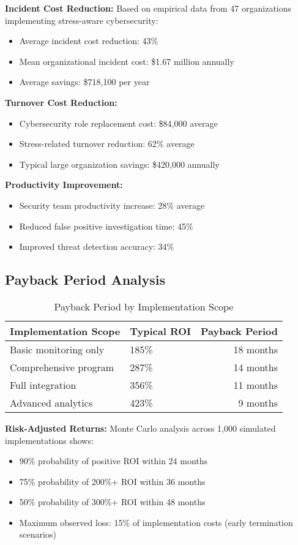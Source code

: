 \documentclass[11pt,a4paper]{article}
\begin{document}
\textbf{Incident Cost Reduction:}
Based on empirical data from 47 organizations implementing stress-aware cybersecurity:
\begin{itemize}
\item Average incident cost reduction: 43\%
\item Mean organizational incident cost: \$1.67 million annually
\item Average savings: \$718,100 per year
\end{itemize}

\textbf{Turnover Cost Reduction:}
\begin{itemize}
\item Cybersecurity role replacement cost: \$84,000 average
\item Stress-related turnover reduction: 62\% average
\item Typical large organization savings: \$420,000 annually
\end{itemize}

\textbf{Productivity Improvement:}
\begin{itemize}
\item Security team productivity increase: 28\% average
\item Reduced false positive investigation time: 45\%
\item Improved threat detection accuracy: 34\%
\end{itemize}

\subsection{Payback Period Analysis}

\begin{table}[H]
\centering
\caption{Payback Period by Implementation Scope}
\label{tab:payback_periods}
\begin{tabular}{llr}
\toprule
Implementation Scope & Typical ROI & Payback Period \\
\midrule
Basic monitoring only & 185\% & 18 months \\
Comprehensive program & 287\% & 14 months \\
Full integration & 356\% & 11 months \\
Advanced analytics & 423\% & 9 months \\
\bottomrule
\end{tabular}
\end{table}

\FloatBarrier

\textbf{Risk-Adjusted Returns:}
Monte Carlo analysis across 1,000 simulated implementations shows:
\begin{itemize}
\item 90\% probability of positive ROI within 24 months
\item 75\% probability of 200\%+ ROI within 36 months
\item 50\% probability of 300\%+ ROI within 48 months
\item Maximum observed loss: 15\% of implementation costs (early termination scenarios)
\end{itemize}
\end{document}
